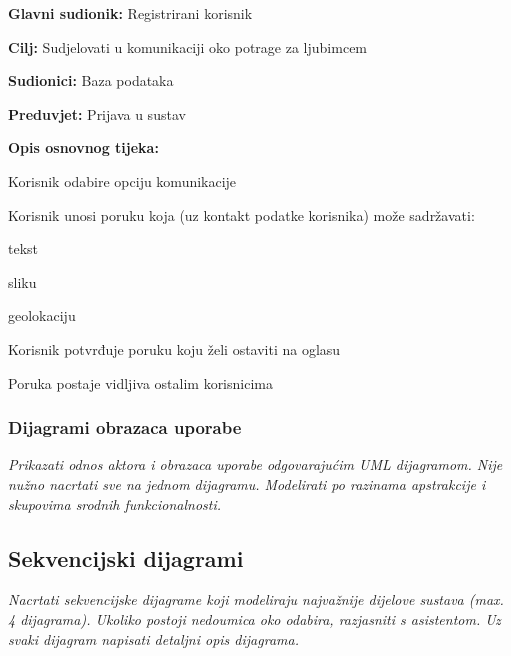 					\noindent {}
					\begin{packed_item}
	
						\item \textbf{Glavni sudionik:} Registrirani korisnik
						\item  \textbf{Cilj:} Sudjelovati u komunikaciji oko potrage za ljubimcem
						\item  \textbf{Sudionici:} Baza podataka
						\item  \textbf{Preduvjet:} Prijava u sustav
						\item  \textbf{Opis osnovnog tijeka:}
						
						\item[] \begin{packed_enum}
	
							\item Korisnik odabire opciju komunikacije
							\item Korisnik unosi poruku koja (uz kontakt podatke korisnika) može sadržavati:
								\item[] \begin{packed_enum}
									\item tekst
									\item sliku
									\item geolokaciju
								\end{packed_enum}
							\item Korisnik potvrđuje poruku koju želi ostaviti na oglasu
							\item Poruka postaje vidljiva ostalim korisnicima
						\end{packed_enum}
					\end{packed_item}
				
					
				\subsubsection{Dijagrami obrazaca uporabe}
					
					\textit{Prikazati odnos aktora i obrazaca uporabe odgovarajućim UML dijagramom. Nije nužno nacrtati sve na jednom dijagramu. Modelirati po razinama apstrakcije i skupovima srodnih funkcionalnosti.}
				\eject		
				
			\subsection{Sekvencijski dijagrami}
				
				\textit{Nacrtati sekvencijske dijagrame koji modeliraju najvažnije dijelove sustava (max. 4 dijagrama). Ukoliko postoji nedoumica oko odabira, razjasniti s asistentom. Uz svaki dijagram napisati detaljni opis dijagrama.}
				\eject
	
